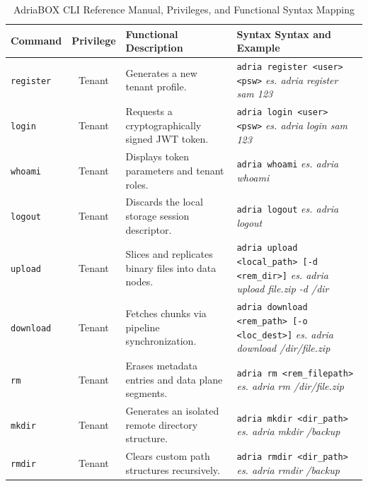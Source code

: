 \begin{table}[htbp]
\small
\centering
\caption{AdriaBOX CLI Reference Manual, Privileges, and Functional Syntax Mapping}
\label{tab:cli_manual}
\vspace{2mm}
\begin{tabularx}{\textwidth}{|l|c|X|p{6.2cm}|}
\hline
\textbf{Command} & \textbf{Privilege} & \textbf{Functional Description} & \textbf{Syntax Syntax and Example} \\ \hline
\texttt{register} & Tenant & Generates a new tenant profile. & \texttt{adria register <user> <psw>} \newline \textit{es. adria register sam 123} \\ \hline
\texttt{login} & Tenant & Requests a cryptographically signed JWT token. & \texttt{adria login <user> <psw>} \newline \textit{es. adria login sam 123} \\ \hline
\texttt{whoami} & Tenant & Displays token parameters and tenant roles. & \texttt{adria whoami} \newline \textit{es. adria whoami} \\ \hline
\texttt{logout} & Tenant & Discards the local storage session descriptor. & \texttt{adria logout} \newline \textit{es. adria logout} \\ \hline
\texttt{upload} & Tenant & Slices and replicates binary files into data nodes. & \texttt{adria upload <local\_path> [-d <rem\_dir>]} \newline \textit{es. adria upload file.zip -d /dir} \\ \hline
\texttt{download} & Tenant & Fetches chunks via pipeline synchronization. & \texttt{adria download <rem\_path> [-o <loc\_dest>]} \newline \textit{es. adria download /dir/file.zip} \\ \hline
\texttt{rm} & Tenant & Erases metadata entries and data plane segments. & \texttt{adria rm <rem\_filepath>} \newline \textit{es. adria rm /dir/file.zip} \\ \hline
\texttt{mkdir} & Tenant & Generates an isolated remote directory structure. & \texttt{adria mkdir <dir\_path>} \newline \textit{es. adria mkdir /backup} \\ \hline
\texttt{rmdir} & Tenant & Clears custom path structures recursively. & \texttt{adria rmdir <dir\_path>} \newline \textit{es. adria rmdir /backup} \\ \hline

\end{tabularx}
\end{table}
